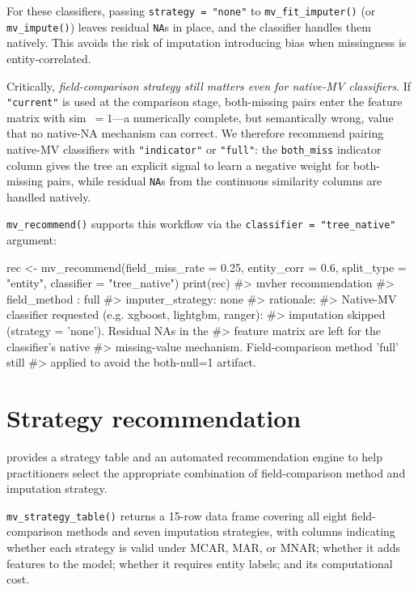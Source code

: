 \documentclass[a4paper]{article}
\begin{document}
\begin{article}
For these classifiers, passing \texttt{strategy = "none"} to
\texttt{mv\_fit\_imputer()} (or \texttt{mv\_impute()}) leaves residual
\texttt{NA}s in place, and the classifier handles them natively.  This
avoids the risk of imputation introducing bias when missingness is
entity-correlated.

Critically, \emph{field-comparison strategy still matters even for
native-MV classifiers}.  If \texttt{"current"} is used at the
comparison stage, both-missing pairs enter the feature matrix with
sim~$= 1$---a numerically complete, but semantically wrong, value that
no native-NA mechanism can correct.  We therefore recommend pairing
native-MV classifiers with \texttt{"indicator"} or \texttt{"full"}:
the \texttt{both\_miss} indicator column gives the tree an explicit
signal to learn a negative weight for both-missing pairs, while
residual \texttt{NA}s from the continuous similarity columns are
handled natively.

\texttt{mv\_recommend()} supports this workflow via the
\texttt{classifier = "tree\_native"} argument:

\begin{example}
rec <- mv_recommend(field_miss_rate = 0.25, entity_corr = 0.6,
                    split_type = "entity",
                    classifier = "tree_native")
print(rec)
#> mvher recommendation
#>   field_method    : full
#>   imputer_strategy: none
#>   rationale:
#>     Native-MV classifier requested (e.g. xgboost, lightgbm, ranger):
#>     imputation skipped (strategy = 'none'). Residual NAs in the
#>     feature matrix are left for the classifier's native
#>     missing-value mechanism. Field-comparison method 'full' still
#>     applied to avoid the both-null=1 artifact.
\end{example}

\section{Strategy recommendation}
\label{sec:recommend}

 provides a strategy table and an automated recommendation
engine to help practitioners select the appropriate combination of
field-comparison method and imputation strategy.

\texttt{mv\_strategy\_table()} returns a 15-row data frame covering all
eight field-comparison methods and seven imputation strategies, with
columns indicating whether each strategy is valid under MCAR, MAR, or
MNAR; whether it adds features to the model; whether it requires
entity labels; and its computational cost.


\end{article}
\end{document}
